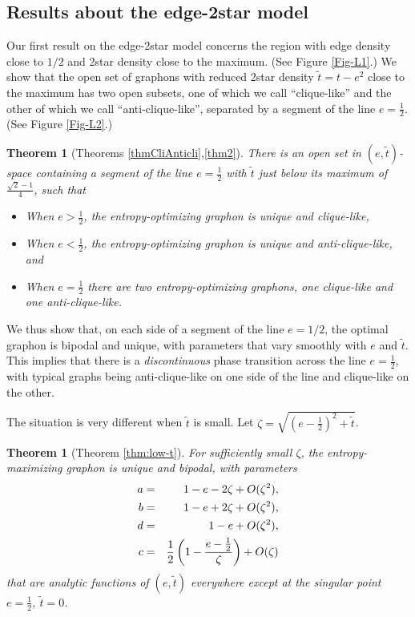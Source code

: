 \documentclass[12pt]{amsart}
\newcommand{\1}{\mathbf{1}}
\newtheorem{theorem}[lemma]{Theorem}
\begin{document}
\subsection{Results about the edge-2star model}

Our first result on the edge-2star model concerns the region with edge density 
close to $1/2$ and 2star density close to the maximum. (See Figure \ref{Fig-L1}.)
 We show that
the open set of 
graphons with
reduced 2star density $\tilde t = t - e^2$ close to the maximum has
two open subsets,
one of which we call ``clique-like'' and the other of which we call
``anti-clique-like'', separated by a segment of the line $e=\frac12$. 
(See Figure \ref{Fig-L2}.)
\begin{theorem}[Theorems \ref{thmCliAnticli},\ref{thm2}] \label{main1} 
There is an open set in $(e, \tilde t)$-space containing a segment of
the line $e=\frac12$ with $\tilde t$ just below its maximum of $\frac{\sqrt{2}-1}{4}$,
such that
\begin{itemize} 
\item When $e>\frac12$, the entropy-optimizing graphon is unique and clique-like,  
\item When $e < \frac12$, the entropy-optimizing graphon is unique and anti-clique-like, and  
\item When $e=\frac12$ there are two entropy-optimizing graphons, one
clique-like and one anti-clique-like.
\end{itemize}
\end{theorem}
We thus show that, on each side of a segment of the line $e=1/2$, the optimal
graphon is bipodal and unique, with parameters that vary smoothly with
$e$ and $\tilde t$.  This implies that there is a {\em discontinuous}
phase transition across the line $e=\frac12$, with typical graphs
being anti-clique-like on one side of the line and clique-like on the
other.

The situation is very different when $\tilde t$ is small. Let 
$\zeta = \sqrt{\left (e-\frac12 \right )^2 + \tilde t}$. 

\begin{theorem}[Theorem \ref{thm:low-t}]\label{main2} 
For sufficiently small $\zeta$, the entropy-maximizing graphon is 
unique and bipodal, with parameters
\begin{eqnarray}
a & = & 1 - e - 2\zeta + O(\zeta^2), \cr 
b & = & 1-e + 2 \zeta + O(\zeta^2), \cr
d & = & 1-e + O(\zeta^2), \cr 
c & = & \frac12 \left (1 - \frac{e-\frac12}{\zeta} \right ) + O(\zeta)
\end{eqnarray}
that are analytic functions of $(e,\tilde t)$ everywhere except at the singular point 
$e=\frac12$, $\tilde t = 0$. 
\end{theorem}
\end{document}
